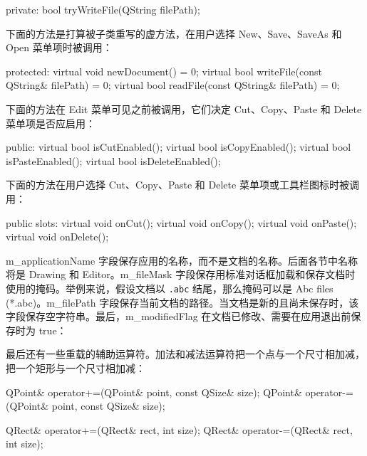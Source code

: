 \begin{codebox}
    private:
        bool tryWriteFile(QString filePath);
\end{codebox}

下面的方法是打算被子类重写的虚方法，在用户选择 New、Save、SaveAs 和 Open 菜单项时被调用：

\begin{codebox}
  protected:
    virtual void newDocument() = 0;
    virtual bool writeFile(const QString& filePath) = 0;
    virtual bool readFile(const QString& filePath) = 0;
\end{codebox}

下面的方法在 Edit 菜单可见之前被调用，它们决定 Cut、Copy、Paste 和 Delete 菜单项是否应启用：

\begin{codebox}
  public:
    virtual bool isCutEnabled();
    virtual bool isCopyEnabled();
    virtual bool isPasteEnabled();
    virtual bool isDeleteEnabled();
\end{codebox}

下面的方法在用户选择 Cut、Copy、Paste 和 Delete 菜单项或工具栏图标时被调用：

\begin{codebox}
  public slots:
    virtual void onCut();
    virtual void onCopy();
    virtual void onPaste();
    virtual void onDelete();
\end{codebox}

m\_applicationName 字段保存应用的名称，而不是文档的名称。后面各节中名称将是 Drawing 和 Editor。m\_fileMask 字段保存用标准对话框加载和保存文档时使用的掩码。举例来说，假设文档以 \texttt{.abc} 结尾，那么掩码可以是 Abc files (*.abc)。m\_filePath 字段保存当前文档的路径。当文档是新的且尚未保存时，该字段保存空字符串。最后，m\_modifiedFlag 在文档已修改、需要在应用退出前保存时为 true：

\begin{codebox}
  private:
    QString m_applicationName, m_fileMask, m_filePath;
    bool m_modifiedFlag = false;
  };
\end{codebox}

最后还有一些重载的辅助运算符。加法和减法运算符把一个点与一个尺寸相加减，把一个矩形与一个尺寸相加减：

\begin{codebox}
QPoint& operator+=(QPoint& point, const QSize& size);
QPoint& operator-=(QPoint& point, const QSize& size);

QRect& operator+=(QRect& rect, int size);
QRect& operator-=(QRect& rect, int size);
\end{codebox}

